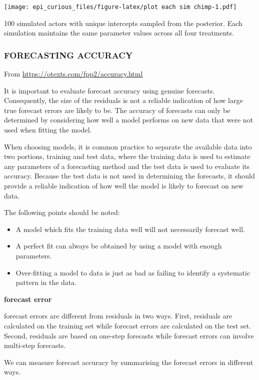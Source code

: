 \documentclass[
]{article}
\begin{document}
\texttt{[image: epi\_curious\_files/figure-latex/plot each sim chimp-1.pdf]}

100 simulated actors with unique intercepts sampled from the posterior.
Each simulation maintains the same parameter values across all four
treatments.

\hypertarget{forecasting-accuracy}{%
\subsubsection{FORECASTING ACCURACY}\label{forecasting-accuracy}}

From \url{https://otexts.com/fpp2/accuracy.html}

It is important to evaluate forecast accuracy using genuine forecasts.
Consequently, the size of the residuals is not a reliable indication of
how large true forecast errors are likely to be. The accuracy of
forecasts can only be determined by considering how well a model
performs on new data that were not used when fitting the model.

When choosing models, it is common practice to separate the available
data into two portions, training and test data, where the training data
is used to estimate any parameters of a forecasting method and the test
data is used to evaluate its accuracy. Because the test data is not used
in determining the forecasts, it should provide a reliable indication of
how well the model is likely to forecast on new data.

The following points should be noted:

\begin{itemize}
\item
  A model which fits the training data well will not necessarily
  forecast well.
\item
  A perfect fit can always be obtained by using a model with enough
  parameters.
\item
  Over-fitting a model to data is just as bad as failing to identify a
  systematic pattern in the data.
\end{itemize}

\textbf{forecast error}

forecast errors are different from residuals in two ways. First,
residuals are calculated on the training set while forecast errors are
calculated on the test set. Second, residuals are based on one-step
forecasts while forecast errors can involve multi-step forecasts.

We can measure forecast accuracy by summarising the forecast errors in
different ways.
\end{document}
